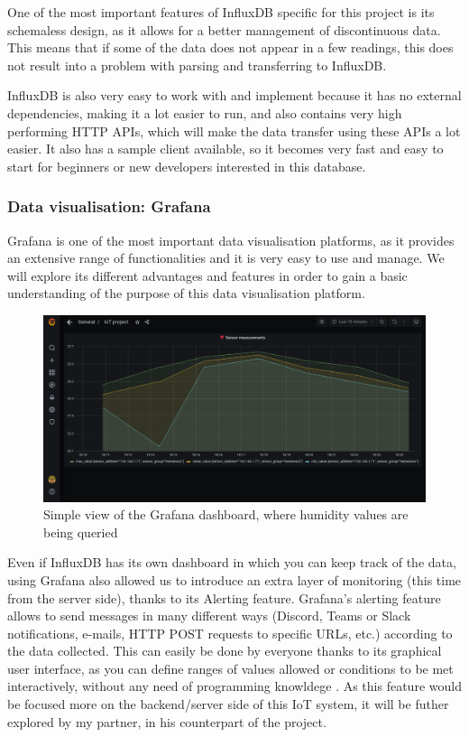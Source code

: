 \documentclass[12pt]{article}
\begin{document}
One of the most important features of InfluxDB specific for this project is its schemaless design, as it allows for a better management of discontinuous data. This means that if some of the data does not appear in a few readings, this does not result into a problem with parsing and transferring to InfluxDB.\par 

InfluxDB is also very easy to work with and implement because it has no external dependencies, making it a lot easier to run, and also contains very high performing HTTP APIs, which will make the data transfer using these APIs a lot easier. It also has a sample client available, so it becomes very fast and easy to start for beginners or new developers interested in this database.

\subsubsection{Data visualisation: Grafana}

Grafana is one of the most important data visualisation platforms, as it provides an extensive range of functionalities and it is very easy to use and manage. We will explore its different advantages and features in order to gain a basic understanding of the purpose of this data visualisation platform.\par

\begin{figure}[h]
\includegraphics[scale=0.3]{grafana-dashboard}
\centering
\caption{Simple view of the Grafana dashboard, where humidity values are being queried}
\label{fig:grafana-dashboard}
\end{figure}

Even if InfluxDB has its own dashboard in which you can keep track of the data, using Grafana also allowed us to introduce an extra layer of monitoring (this time from the server side), thanks to its Alerting feature. Grafana's alerting feature allows to send messages in many different ways (Discord, Teams or Slack notifications, e-mails, HTTP POST requests to specific URLs, etc.) according to the data collected. This can easily be done by everyone thanks to its graphical user interface, as you can define ranges of values allowed or conditions to be met interactively, without any need of programming knowldege \cite{grafana}. As this feature would be focused more on the backend/server side of this IoT system, it will be futher explored by my partner, in his counterpart of the project.
\end{document}
